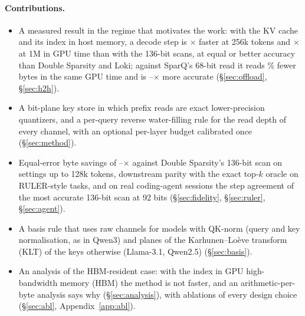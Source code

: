 \documentclass[10pt,twocolumn]{article}
\begin{document}
\paragraph{Contributions.}
\begin{itemize}\setlength\itemsep{1pt}
\item A measured result in the regime that motivates the work: with the KV cache and its index in host memory, a decode step is \ratioGPUchanAt$\times$ faster at 256k tokens and \ratioGPUchanr$\times$ at 1M in GPU time than with the 136-bit scans, at equal or better accuracy than Double Sparsity and Loki; against SparQ's 68-bit read it reads \fortyEightBytesFewerPct\% fewer bytes in the same GPU time and is \hthRatioMin--\hthRatioMax$\times$ more accurate (\S\ref{sec:offload}, \S\ref{sec:h2h}).
\item A bit-plane key store in which prefix reads are exact lower-precision quantizers, and a per-query reverse water-filling rule for the read depth of every channel, with an optional per-layer budget calibrated once (\S\ref{sec:method}).
\item Equal-error byte savings of \matchDSratioMin--\matchDSratioMax$\times$ against Double Sparsity's 136-bit scan on \nSettings{} settings up to 128k tokens, downstream parity with the exact top-$k$ oracle on RULER-style tasks, and on real coding-agent sessions the step agreement of the most accurate 136-bit scan at 92 bits (\S\ref{sec:fidelity}, \S\ref{sec:ruler}, \S\ref{sec:agent}).
\item A basis rule that uses raw channels for models with QK-norm (query and key normalisation, as in Qwen3) and planes of the Karhunen--Lo\`eve transform (KLT) of the keys otherwise (Llama-3.1, Qwen2.5) (\S\ref{sec:basis}).
\item An analysis of the HBM-resident case: with the index in GPU high-bandwidth memory (HBM) the method is not faster, and an arithmetic-per-byte analysis says why (\S\ref{sec:analysis}), with ablations of every design choice (\S\ref{sec:abl}, Appendix~\ref{app:abl}).
\end{itemize}
\end{document}
